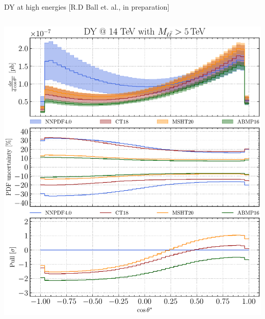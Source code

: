 \documentclass[aspectratio=169,9pt]{beamer}
\begin{document}
\begin{frame}{DY at high energies [R.D Ball et. al., in preparation]}
    \vspace*{-3em}
    \begin{columns}
        \begin{column}{0.66\textwidth}
            \begin{column}{0.5\textwidth}
                \includegraphics[width=\textwidth]{CMS_DY_14TEV_MLL_5000_COSTH}
            \end{column}
            \begin{column}{0.5\textwidth}

\end{column}
\end{column}
\end{columns}
\end{frame}
\end{document}
